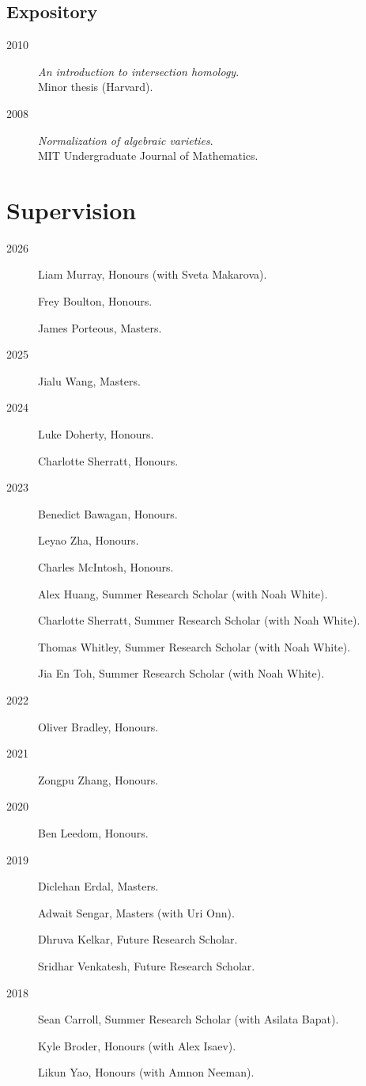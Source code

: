 \documentclass[11pt]{article}
\begin{document}
\subsection*{Expository}
\label{sec:orga0de1e6}
\label{org2f80448}
\begin{description}
\item[{2010}] \emph{An introduction to intersection homology}.\\
Minor thesis (Harvard).
\item[{2008}] \emph{Normalization of algebraic varieties}.\\
MIT Undergraduate Journal of Mathematics.
\end{description}
\section*{Supervision}
\label{sec:org61db12e}

\label{orgc81c5f0}
\begin{description}
\item[{2026}] Liam Murray, Honours (with Sveta Makarova).

Frey Boulton, Honours.

James Porteous, Masters.
\item[{2025}] Jialu Wang, Masters.
\item[{2024}] Luke Doherty, Honours.

Charlotte Sherratt, Honours.
\item[{2023}] Benedict Bawagan, Honours.

Leyao Zha, Honours.

Charles McIntosh, Honours.

Alex Huang, Summer Research Scholar (with Noah White).

Charlotte Sherratt, Summer Research Scholar (with Noah White).

Thomas Whitley, Summer Research Scholar (with Noah White).

Jia En Toh, Summer Research Scholar (with Noah White).
\item[{2022}] Oliver Bradley, Honours.
\item[{2021}] Zongpu Zhang, Honours.
\item[{2020}] Ben Leedom, Honours.
\item[{2019}] Diclehan Erdal, Masters.

Adwait Sengar, Masters (with Uri Onn).

Dhruva Kelkar, Future Research Scholar.

Sridhar Venkatesh, Future Research Scholar.
\item[{2018}] Sean Carroll, Summer Research Scholar (with Asilata Bapat).

Kyle Broder, Honours (with Alex Isaev).

Likun Yao, Honours (with Amnon Neeman).
\end{description}
\end{document}
